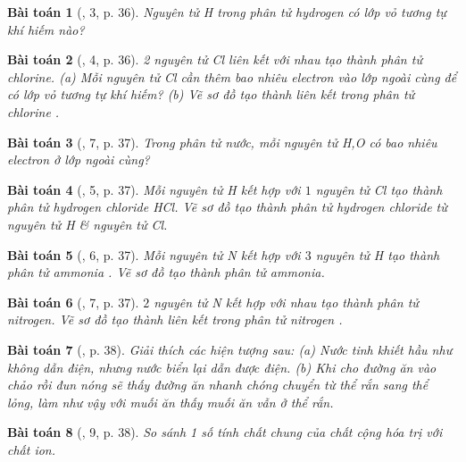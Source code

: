 \documentclass{article}
\newtheorem{baitoan}{Bài toán}
\begin{document}
\begin{baitoan}[\cite{SGK_KHTN_7_Canh_Dieu}, 3, p. 36]
	Nguyên tử \emph{H} trong phân tử hydrogen \emph{} có lớp vỏ tương tự khí hiếm nào?
\end{baitoan}

\begin{baitoan}[\cite{SGK_KHTN_7_Canh_Dieu}, 4, p. 36]
	2 nguyên tử \emph{Cl} liên kết với nhau tạo thành phân tử chlorine. (a) Mỗi nguyên tử \emph{Cl} cần thêm bao nhiêu electron vào lớp ngoài cùng để có lớp vỏ tương tự khí hiếm? (b) Vẽ sơ đồ tạo thành liên kết trong phân tử chlorine \emph{}.
\end{baitoan}

\begin{baitoan}[\cite{SGK_KHTN_7_Canh_Dieu}, 7, p. 37]
	Trong phân tử nước, mỗi nguyên tử \emph{H,O} có bao nhiêu electron ở lớp ngoài cùng?
\end{baitoan}

\begin{baitoan}[\cite{SGK_KHTN_7_Canh_Dieu}, 5, p. 37]
	Mỗi nguyên tử \emph{H} kết hợp với $1$ nguyên tử \emph{Cl} tạo thành phân tử hydrogen chloride \emph{HCl}. Vẽ sơ đồ tạo thành phân tử hydrogen chloride từ nguyên tử \emph{H} \& nguyên tử \emph{Cl}.
\end{baitoan}

\begin{baitoan}[\cite{SGK_KHTN_7_Canh_Dieu}, 6, p. 37]
	Mỗi nguyên tử \emph{N} kết hợp với $3$ nguyên tử \emph{H} tạo thành phân tử ammonia \emph{}. Vẽ sơ đồ tạo thành phân tử ammonia.
\end{baitoan}

\begin{baitoan}[\cite{SGK_KHTN_7_Canh_Dieu}, 7, p. 37]
	$2$ nguyên tử \emph{N} kết hợp với nhau tạo thành phân tử nitrogen. Vẽ sơ đồ tạo thành liên kết trong phân tử nitrogen \emph{}.
\end{baitoan}

\begin{baitoan}[\cite{SGK_KHTN_7_Canh_Dieu}, p. 38]
	Giải thích các hiện tượng sau: (a) Nước tinh khiết hầu như không dẫn điện, nhưng nước biển lại dẫn được điện. (b) Khi cho đường ăn vào chảo rồi đun nóng sẽ thấy đường ăn nhanh chóng chuyển từ thể rắn sang thể lỏng, làm như vậy với muối ăn thấy muối ăn vẫn ở thể rắn.
\end{baitoan}

\begin{baitoan}[\cite{SGK_KHTN_7_Canh_Dieu}, 9, p. 38]
	So sánh 1 số tính chất chung của chất cộng hóa trị với chất ion.
\end{baitoan}
\end{document}
